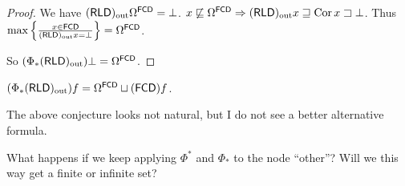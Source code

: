 \begin{proof}
We have $(\mathsf{RLD})_{\mathrm{out}}\Omega^{\mathsf{FCD}} = \bot$.
$x\not\sqsubseteq\Omega^{\mathsf{FCD}} \Rightarrow
(\mathsf{RLD})_{\mathrm{out}} x\sqsupseteq\operatorname{Cor} x\sqsupset\bot$.
Thus $\max\left\{ \frac{x\in\mathsf{FCD}}{(\mathsf{RLD})_{\mathrm{out}} x=\bot}\right\}=
\Omega^{\mathsf{FCD}}$.

So $(\Phi_{\ast}(\mathsf{RLD})_{\mathrm{out}})\bot = \Omega^{\mathsf{FCD}}$.
\end{proof}

\begin{conjecture}
$(\Phi_{\ast}(\mathsf{RLD})_{\mathrm{out}})f =
\Omega^{\mathsf{FCD}}\sqcup(\mathsf{FCD}) f$.
\end{conjecture}

The above conjecture looks not natural, but I do not see
a better alternative formula.

\begin{question}
What happens if we keep applying $\Phi^{\ast}$ and $\Phi_{\ast}$ to the node ``other''?
Will we this way get a finite or infinite set?
\end{question}
